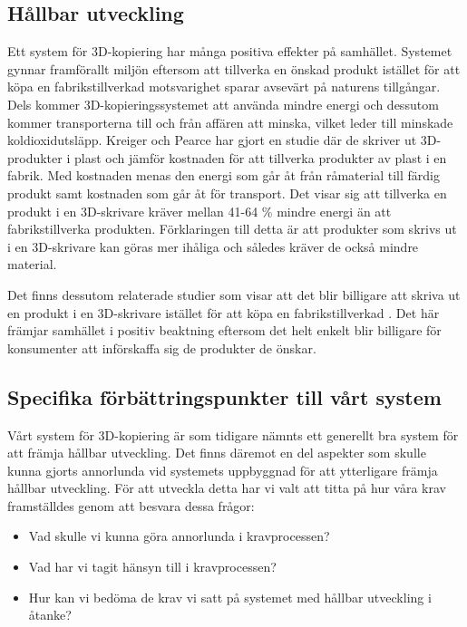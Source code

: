 \subsection{Hållbar utveckling}
\label{disc:hållbar_utveckling}
Ett system för 3D-kopiering har många positiva effekter på samhället. Systemet gynnar framförallt miljön eftersom att tillverka en önskad produkt istället för att köpa en fabrikstillverkad motsvarighet sparar avsevärt på naturens tillgångar. Dels kommer 3D-kopieringssystemet att använda mindre energi och dessutom kommer transporterna till och från affären att minska, vilket leder till minskade koldioxidutsläpp. Kreiger och Pearce  \cite{kreiger2013environmental} har gjort en studie där de skriver ut 3D-produkter i plast och jämför kostnaden för att tillverka produkter av plast i en fabrik. Med kostnaden menas den energi som går åt från råmaterial till färdig produkt samt kostnaden som går åt för transport. Det visar sig att tillverka en produkt i en 3D-skrivare kräver mellan 41-64 \% mindre energi än att fabrikstillverka produkten. Förklaringen till detta är att produkter som skrivs ut i en 3D-skrivare kan göras mer ihåliga och således kräver de också mindre material.

Det finns dessutom relaterade studier som visar att det blir billigare att skriva ut en produkt i en 3D-skrivare istället för att köpa en fabrikstillverkad \cite{wittbrodt2013life}. Det här främjar samhället i positiv beaktning eftersom det helt enkelt blir billigare för konsumenter att införskaffa sig de produkter de önskar.

\subsection{Specifika förbättringspunkter till vårt system}
Vårt system för 3D-kopiering är som tidigare nämnts ett generellt bra system för att främja hållbar utveckling. Det finns däremot en del aspekter som skulle kunna gjorts annorlunda vid systemets uppbyggnad för att ytterligare främja hållbar utveckling. För att utveckla detta har vi valt att titta på hur våra krav framställdes genom att besvara dessa frågor:

\begin{itemize}
	\item Vad skulle vi kunna göra annorlunda i kravprocessen?
	\item Vad har vi tagit hänsyn till i kravprocessen?
	\item Hur kan vi bedöma de krav vi satt på systemet med hållbar utveckling i åtanke?
\end{itemize}

